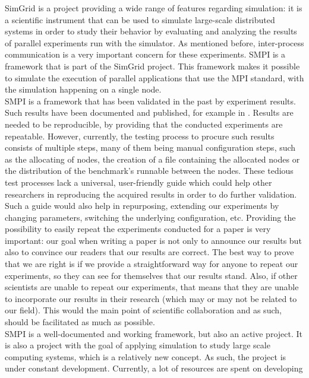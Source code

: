 SimGrid\cite{clq08} is a project providing a wide range of features
regarding simulation: it is a scientific instrument that can be
used to simulate large-scale distributed systems in order to study
their behavior by evaluating and analyzing the results of parallel
experiments run with the simulator. As mentioned before, inter-process
communication is a very important concern for these experiments. SMPI
is a framework that is part of the SimGrid project. This framework
makes it possible to simulate the execution of parallel applications
that use the MPI standard, with the simulation happening on a single
node.\\[0.3cm]
SMPI is a framework that has been validated in the past by experiment
results. Such results have been documented and published, for example
in \cite{csgscq11}. Results are needed to be reproducible, by
providing that the conducted experiments are repeatable. However,
currently, the testing process to procure such results
consists of multiple steps, many of them being manual configuration
steps, such as the allocating of nodes, the creation of a file
containing the allocated nodes or the distribution of the benchmark's
runnable between the nodes. These tedious test processes lack a
universal, user-friendly guide which could help other researchers in
reproducing the
acquired results in order to do further validation. Such a guide would
also help in repurposing, extending our experiments by changing
parameters, switching the underlying configuration, etc. Providing the
possibility to easily repeat the experiments conducted for a paper
is very important: our goal when writing a paper is not only to
announce our results but also to convince our readers that our results
are correct.\cite{m10} The best way to prove that we are right is if
we provide a straightforward way for anyone to repeat our experiments,
so they can see for themselves that our results stand. Also, if other
scientists are unable to repeat our experiments, that means that they
are unable to incorporate our results in their research (which may or
may not be related to our field). This would the main point of
scientific collaboration and as such, should be facilitated as much as
possible.\\[0.3cm]
SMPI is a well-documented and working framework, but also an active
project. It is also a project with the goal of applying simulation to
study large scale computing systems, which is a relatively new
concept. As such, the project is under constant
development. Currently, a lot of resources are spent on developing
